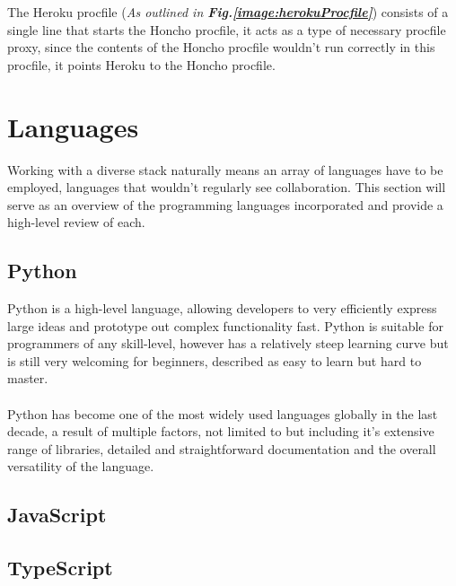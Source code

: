 The Heroku procfile (\textit{As outlined in \textbf{Fig.\ref{image:herokuProcfile}}}) consists of a single line that starts the Honcho procfile, it acts as a type of necessary procfile proxy, since the contents of the Honcho procfile wouldn't run correctly in this procfile, it points Heroku to the Honcho procfile.

\begin{center}

\end{center}

\section{Languages}
Working with a diverse stack naturally means an array of languages have to be employed, languages that wouldn't regularly see collaboration. This section will serve as an overview of the programming languages incorporated and provide a high-level review of each.

\subsection{Python}
Python is a high-level language, allowing developers to very efficiently express large ideas and prototype out complex functionality fast. Python is suitable for programmers of any skill-level, however has a relatively steep learning curve but is still very welcoming for beginners, described as easy to learn but hard to master.

\paragraph{}
Python has become one of the most widely used languages globally in the last decade, a result of multiple factors, not limited to but including it's extensive range of libraries, detailed and straightforward documentation \cite{PYTHON} and the overall versatility of the language.

\paragraph{}

\subsection{JavaScript}
\subsection{TypeScript}
